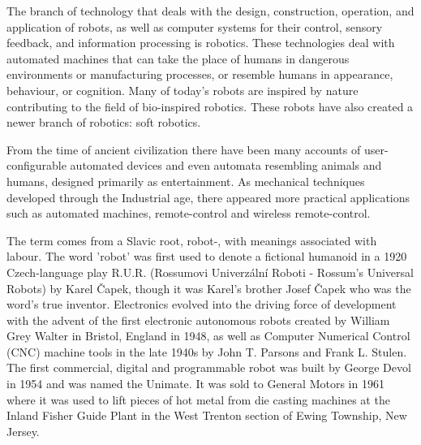 \setlength{\parskip}{1em}
\setlength{\parindent}{0em}

\noindent
The branch of technology that deals with the design, construction, operation,
and application of robots, as well as computer systems for their control,
sensory feedback, and information processing is robotics. These technologies
deal with automated machines that can take the place of humans in dangerous
environments or manufacturing processes, or resemble humans in appearance,
behaviour, or cognition. Many of today's robots are inspired by nature
contributing to the field of bio-inspired robotics. These robots have also
created a newer branch of robotics: soft robotics.

From the time of ancient civilization there have been many accounts of
user-configurable automated devices and even automata resembling animals and
humans, designed primarily as entertainment. As mechanical techniques developed
through the Industrial age, there appeared more practical applications such as
automated machines, remote-control and wireless remote-control.

The term comes from a Slavic root, robot-, with meanings associated with
labour. The word 'robot' was first used to denote a fictional humanoid in a
1920 Czech-language play R.U.R. (Rossumovi Univerzální Roboti - Rossum's
Universal Robots) by Karel Čapek, though it was Karel's brother Josef Čapek who
was the word's true inventor. Electronics evolved into the driving force of
development with the advent of the first electronic autonomous robots created
by William Grey Walter in Bristol, England in 1948, as well as Computer
Numerical Control (CNC) machine tools in the late 1940s by John T. Parsons and
Frank L. Stulen. The first commercial, digital and programmable robot was built
by George Devol in 1954 and was named the Unimate. It was sold to General
Motors in 1961 where it was used to lift pieces of hot metal from die casting
machines at the Inland Fisher Guide Plant in the West Trenton section of Ewing
Township, New Jersey.
